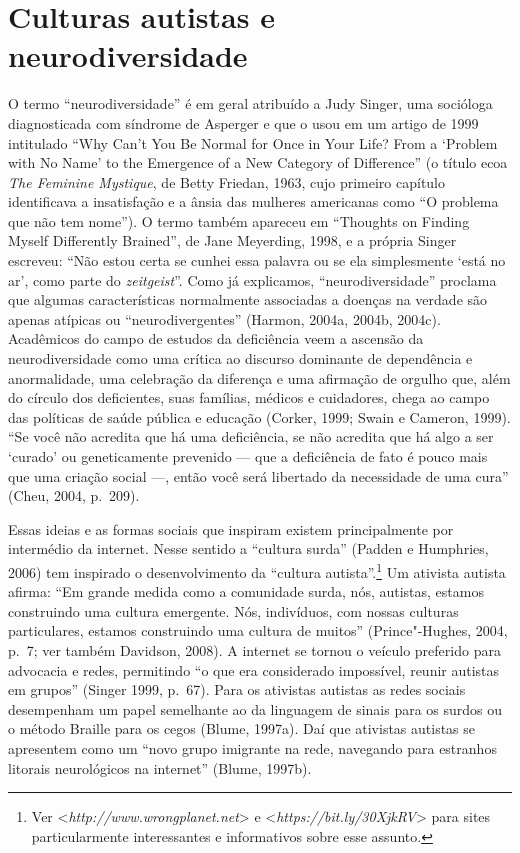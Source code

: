 \section{Culturas autistas e neurodiversidade}

O termo ``neurodiversidade'' é em geral atribuído a Judy Singer, uma
socióloga diagnosticada com síndrome de Asperger e que o usou em um
artigo de 1999 intitulado ``Why Can't You Be Normal for Once in Your
Life? From a `Problem with No Name' to the Emergence of a New Category
of Difference'' (o título ecoa \emph{The Feminine Mystique}, de Betty
Friedan, 1963, cujo primeiro capítulo identificava a insatisfação e a
ânsia das mulheres americanas como ``O problema que não tem nome''). O
termo também apareceu em ``Thoughts on Finding Myself Differently
Brained'', de Jane Meyerding, 1998, e a própria Singer escreveu: ``Não
estou certa se cunhei essa palavra ou se ela simplesmente `está no
ar', como parte do \emph{zeitgeist}''. Como já explicamos, ``neurodiversidade''
proclama que algumas características normalmente associadas a doenças na
verdade são apenas atípicas ou ``neurodivergentes'' (Harmon, 2004a,
2004b, 2004c). Acadêmicos do campo de estudos da deficiência veem a
ascensão da neurodiversidade como uma crítica ao discurso dominante de
dependência e anormalidade, uma celebração da diferença e uma afirmação
de orgulho que, além do círculo dos deficientes, suas famílias,
médicos e cuidadores, chega ao campo das políticas de saúde pública e
educação (Corker, 1999; Swain e Cameron, 1999). ``Se você não acredita
que há uma deficiência, se não acredita que há algo a ser `curado' ou
geneticamente prevenido --- que a deficiência de fato é pouco mais que
uma criação social ---, então você será libertado da necessidade de uma
cura'' (Cheu, 2004, p.~209).

Essas ideias e as formas sociais que inspiram existem principalmente por
intermédio da internet. Nesse sentido a ``cultura surda'' (Padden e
Humphries, 2006) tem inspirado o desenvolvimento da ``cultura
autista''.\footnote[17]{Ver \textless{}\emph{http://www.wrongplanet.net}\textgreater{} e
\textless{}\emph{https://bit.ly/30XjkRV}\textgreater{}
para sites particularmente interessantes e informativos sobre esse
assunto.} Um ativista autista afirma:
``Em grande medida como a comunidade surda, nós,
autistas, estamos construindo uma cultura emergente. Nós, indivíduos,
com nossas culturas particulares, estamos construindo uma cultura de
muitos'' (Prince"-Hughes, 2004, p.~7; ver também Davidson, 2008). A
internet se tornou o veículo preferido para advocacia e redes,
permitindo ``o que era considerado impossível, reunir autistas em
grupos'' (Singer 1999, p.~67). Para os ativistas autistas as redes
sociais desempenham um papel semelhante ao da linguagem de sinais para
os surdos ou o método Braille para os cegos (Blume, 1997a). Daí que
ativistas autistas se apresentem como um ``novo grupo imigrante na
rede, navegando para estranhos litorais neurológicos na internet''
(Blume, 1997b).

